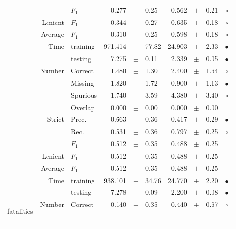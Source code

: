 \begin{longtable}{|r|r|l||rcl|rcl|c|}
\cline{3-10}
  &  &  $F_1$  & 0.277 &  $\pm$  & 0.25 & 0.562 &  $\pm$  & 0.21 &  $\circ$\\
\cline{2-10}
  & Lenient &  $F_1$  & 0.344 &  $\pm$  & 0.27 & 0.635 &  $\pm$  & 0.18 &  $\circ$\\
\cline{2-10}
  & Average &  $F_1$  & 0.310 &  $\pm$  & 0.25 & 0.598 &  $\pm$  & 0.18 &  $\circ$\\
\cline{2-10}
  & \multirow{2}{*}{Time} &  training  & 971.414 &  $\pm$  & 77.82 & 24.903 &  $\pm$  & 2.33 &  $\bullet$\\
\cline{3-10}
  &  &  testing  & 7.275 &  $\pm$  & 0.11 & 2.339 &  $\pm$  & 0.05 &  $\bullet$\\
\hline
\pagebreak[4]
\hline
\multirow{11}{*}{\begin{sideways}injuries\end{sideways} } & \multirow{4}{*}{Number} &  Correct  & 1.480 &  $\pm$  & 1.30 & 2.400 &  $\pm$  & 1.64 &  $\circ$\\
\cline{3-10}
  &  &  Missing  & 1.820 &  $\pm$  & 1.72 & 0.900 &  $\pm$  & 1.13 &  $\bullet$\\
\cline{3-10}
  &  &  Spurious  & 1.740 &  $\pm$  & 3.59 & 4.380 &  $\pm$  & 3.40 &  $\circ$\\
\cline{3-10}
  &  &  Overlap  & 0.000 &  $\pm$  & 0.00 & 0.000 &  $\pm$  & 0.00 &   \\
\cline{2-10}
  & \multirow{3}{*}{Strict} &  Prec.  & 0.663 &  $\pm$  & 0.36 & 0.417 &  $\pm$  & 0.29 &  $\bullet$\\
\cline{3-10}
  &  &  Rec.  & 0.531 &  $\pm$  & 0.36 & 0.797 &  $\pm$  & 0.25 &  $\circ$\\
\cline{3-10}
  &  &  $F_1$  & 0.512 &  $\pm$  & 0.35 & 0.488 &  $\pm$  & 0.25 &   \\
\cline{2-10}
  & Lenient &  $F_1$  & 0.512 &  $\pm$  & 0.35 & 0.488 &  $\pm$  & 0.25 &   \\
\cline{2-10}
  & Average &  $F_1$  & 0.512 &  $\pm$  & 0.35 & 0.488 &  $\pm$  & 0.25 &   \\
\cline{2-10}
  & \multirow{2}{*}{Time} &  training  & 938.101 &  $\pm$  & 34.76 & 24.770 &  $\pm$  & 2.20 &  $\bullet$\\
\cline{3-10}
  &  &  testing  & 7.278 &  $\pm$  & 0.09 & 2.200 &  $\pm$  & 0.08 &  $\bullet$\\
\hline
\hline
\multirow{11}{*}{\begin{sideways}fatalities\end{sideways} } & \multirow{4}{*}{Number} &  Correct  & 0.140 &  $\pm$  & 0.35 & 0.440 &  $\pm$  & 0.67 &  $\circ$\\

\end{longtable}
